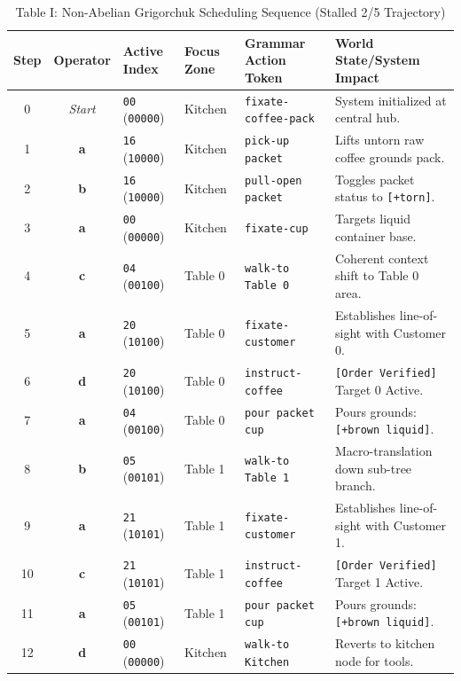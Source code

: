 \documentclass[11pt,journal,onecolumn]{IEEEtran}
\begin{document}
\begin{table}[htbp]
\caption{Table I: Non-Abelian Grigorchuk Scheduling Sequence (Stalled 2/5 Trajectory)}
\label{tab:grigorchuk}
\centering
\begin{tabular}{ccllll}
\toprule
\textbf{Step} & \textbf{Operator} & \textbf{Active Index} & \textbf{Focus Zone} & \textbf{Grammar Action Token} & \textbf{World State/System Impact} \\
\midrule
0  & \textit{Start} & \texttt{00} (\texttt{00000}) & Kitchen & \texttt{fixate-coffee-pack} & System initialized at central hub. \\
1  & \textbf{a}     & \texttt{16} (\texttt{10000}) & Kitchen & \texttt{pick-up packet}      & Lifts untorn raw coffee grounds pack. \\
2  & \textbf{b}     & \texttt{16} (\texttt{10000}) & Kitchen & \texttt{pull-open packet}     & Toggles packet status to \texttt{[+torn]}. \\
3  & \textbf{a}     & \texttt{00} (\texttt{00000}) & Kitchen & \texttt{fixate-cup}           & Targets liquid container base. \\
4  & \textbf{c}     & \texttt{04} (\texttt{00100}) & Table 0 & \texttt{walk-to Table 0}      & Coherent context shift to Table 0 area. \\
5  & \textbf{a}     & \texttt{20} (\texttt{10100}) & Table 0 & \texttt{fixate-customer}      & Establishes line-of-sight with Customer 0. \\
6  & \textbf{d}     & \texttt{20} (\texttt{10100}) & Table 0 & \texttt{instruct-coffee}      & \texttt{[Order Verified]} Target 0 Active. \\
7  & \textbf{a}     & \texttt{04} (\texttt{00100}) & Table 0 & \texttt{pour packet cup}      & Pours grounds: \texttt{[+brown liquid]}. \\
8  & \textbf{b}     & \texttt{05} (\texttt{00101}) & Table 1 & \texttt{walk-to Table 1}      & Macro-translation down sub-tree branch. \\
9  & \textbf{a}     & \texttt{21} (\texttt{10101}) & Table 1 & \texttt{fixate-customer}      & Establishes line-of-sight with Customer 1. \\
10 & \textbf{c}     & \texttt{21} (\texttt{10101}) & Table 1 & \texttt{instruct-coffee}      & \texttt{[Order Verified]} Target 1 Active. \\
11 & \textbf{a}     & \texttt{05} (\texttt{00101}) & Table 1 & \texttt{pour packet cup}      & Pours grounds: \texttt{[+brown liquid]}. \\
12 & \textbf{d}     & \texttt{00} (\texttt{00000}) & Kitchen & \texttt{walk-to Kitchen}      & Reverts to kitchen node for tools. \\

\end{tabular}
\end{table}
\end{document}
